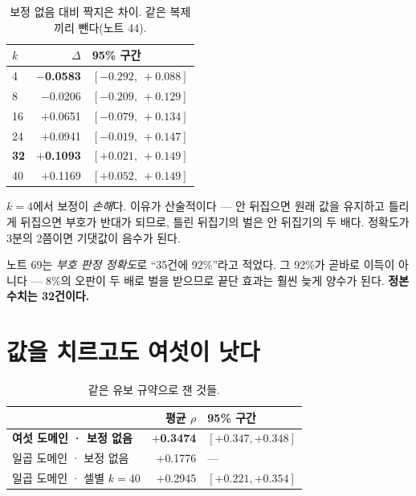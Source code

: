 \documentclass[10pt]{article}
\begin{document}
\begin{table}[t]
\centering\tsize
\caption{보정 없음 대비 짝지은 차이. 같은 복제끼리 뺀다(노트 44).}
\begin{tabular}{lrl}
\toprule
$k$ & $\Delta$ & 95\% 구간 \\
\midrule
4 & \textbf{$-$0.0583} & $[-0.292,\ +0.088]$ \\
8 & $-$0.0206 & $[-0.209,\ +0.129]$ \\
16 & $+$0.0651 & $[-0.079,\ +0.134]$ \\
24 & $+$0.0941 & $[-0.019,\ +0.147]$ \\
\textbf{32} & \textbf{$+$0.1093} & $\mathbf{[+0.021,\ +0.149]}$ \\
40 & $+$0.1169 & $[+0.052,\ +0.149]$ \\
\bottomrule
\end{tabular}
\end{table}

$k{=}4$에서 보정이 \emph{손해}다. 이유가 산술적이다 --- 안 뒤집으면 원래 값을
유지하고 틀리게 뒤집으면 부호가 반대가 되므로, 틀린 뒤집기의 벌은 안 뒤집기의
두 배다. 정확도가 3분의 2쯤이면 기댓값이 음수가 된다.


노트 69는 \emph{부호 판정 정확도}로 ``35건에 92\%''라고 적었다. 그 92\%가
곧바로 이득이 아니다 --- 8\%의 오판이 두 배로 벌을 받으므로 끝단 효과는
훨씬 늦게 양수가 된다. \textbf{정본 수치는 32건이다.}

\section{값을 치르고도 여섯이 낫다}

\begin{table}[t]
\centering\tsize
\caption{같은 유보 규약으로 잰 것들.}
\begin{tabular}{lrl}
\toprule
& 평균 $\rho$ & 95\% 구간 \\
\midrule
\textbf{여섯 도메인 · 보정 없음} & \textbf{$+$0.3474} & $[+0.347, +0.348]$ \\
일곱 도메인 · 보정 없음 & $+$0.1776 & --- \\
일곱 도메인 · 셀별 $k{=}40$ & $+$0.2945 & $[+0.221, +0.354]$ \\
\bottomrule
\end{tabular}
\end{table}
\end{document}
